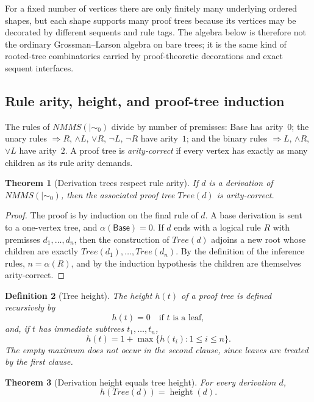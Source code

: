 \documentclass[11pt]{article}
\newtheorem{theorem}{Theorem}
\newtheorem{definition}[theorem]{Definition}
\newcommand{\mszero}{\mathrel{\mid\!\sim_{0}}}
\newcommand{\NMMS}{\mathit{NMMS}}
\newcommand{\Tree}{\mathit{Tree}}
\begin{document}
\noindent
For a fixed number of vertices there are only finitely many underlying ordered
shapes, but each shape supports many proof trees because its vertices may be
decorated by different sequents and rule tags.  The algebra below is therefore
not the ordinary Grossman--Larson algebra on bare trees; it is the same kind
of rooted-tree combinatorics carried by proof-theoretic decorations and exact
sequent interfaces.

\subsection{Rule arity, height, and proof-tree induction}

The rules of $\NMMS(\mszero)$ divide by number of premisses: Base has arity~$0$; the unary rules $\Rightarrow R$, $\wedge L$, $\vee R$, $\neg L$, $\neg R$ have arity~$1$; and the binary rules $\Rightarrow L$, $\wedge R$, $\vee L$ have arity~$2$. A proof tree is \emph{arity-correct} if every vertex has exactly as many children as its rule arity demands.

\begin{theorem}[Derivation trees respect rule arity]
If \(d\) is a derivation of \(\NMMS(\mszero)\), then the associated proof tree
\(\Tree(d)\) is arity-correct.
\end{theorem}

\begin{proof}
The proof is by induction on the final rule of \(d\). A base derivation is sent
to a one-vertex tree, and \(\alpha(\mathsf{Base})=0\). If \(d\) ends with a
logical rule \(R\) with premisses \(d_1,\ldots,d_n\), then the construction of
\(\Tree(d)\) adjoins a new root whose children are exactly
\(\Tree(d_1),\ldots,\Tree(d_n)\). By the definition of the inference rules,
\(n=\alpha(R)\), and by the induction hypothesis the children are themselves
arity-correct.
\end{proof}

\begin{definition}[Tree height]
The \emph{height} \(h(t)\) of a proof tree is defined recursively by
\[
h(t)=0
\quad\text{if }t\text{ is a leaf},
\]
and, if \(t\) has immediate subtrees \(t_1,\ldots,t_n\),
\[
h(t)=1+\max\{h(t_i):1\le i\le n\}.
\]
The empty maximum does not occur in the second clause, since leaves are treated
by the first clause.
\end{definition}

\begin{theorem}[Derivation height equals tree height]
For every derivation \(d\),
\[
h(\Tree(d))=\operatorname{height}(d).
\]
\end{theorem}
\end{document}
